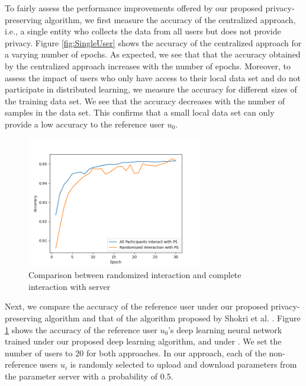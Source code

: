 \documentclass[letterpaper]{article}
\begin{document}
\begin{flushleft}
{To fairly assess the performance improvements offered by our proposed privacy-preserving algorithm, we first measure the accuracy of
the centralized approach, i.e., a single entity who collects the data from all users but does not provide privacy. 
Figure \ref{fig:SingleUser} shows the accuracy of the centralized approach for a varying number of epochs. As expected, we see that
that the accuracy obtained by the centralized approach increases with the number of epochs. 
Moreover, to assess the impact of users who only have access to their local data set and do not participate in distributed
learning, we measure the accuracy for different sizes of the training data set. We see that the accuracy decreases with the number
of samples in the data set. This confirms that a small local data set can only provide a low accuracy to the reference user $u_0$.

\begin{figure}[H]
  \centering
    \includegraphics[width=3in]{RandomVsAll.png}
    \caption[Comparison between randomized interaction and complete interaction with server.]{\label{fig:RandVsAll} Comparison between randomized interaction and complete interaction with server}
  \end{figure}



Next, we compare the accuracy of the reference user under our proposed privacy-preserving algorithm and that of the algorithm proposed
by Shokri et al. \cite{shokri2015privacy}. Figure \ref{fig:RandVsAll} shows the accuracy of the reference user $u_0$'s deep learning
neural network trained under our proposed deep learning algorithm, and under \cite{shokri2015privacy}. We set the number of
users to 20 for both approaches. In our approach, each of the non-reference users $u_i$ is randomly
selected to upload and download parameters from the parameter server with a probability of 0.5. 


}
\end{flushleft}
\end{document}
